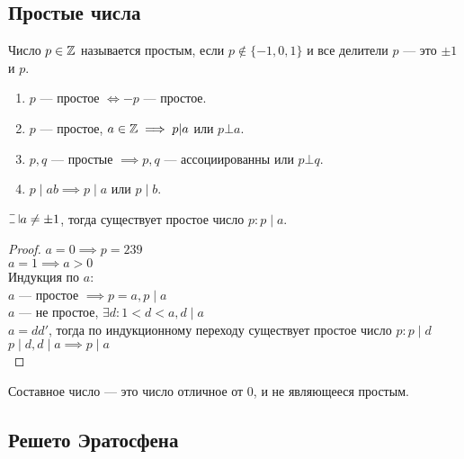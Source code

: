 \begin{normalsize}

\section{Простые числа}

\begin{defn}
    Число $p \in \mathbb{Z}$ называется простым, если $p \notin \{-1, 0, 1\}$ и все делители $p$ --- это $\pm 1$ и $p$.
\end{defn}

\begin{prop}
    \begin{enumerate}
        \item $p$ --- простое $\iff -p$ --- простое.
        \item $p$ --- простое, $a \in \mathbb{Z} \implies p | a$ или $p \bot a$.
        \item $p, q$ --- простые $\implies p, q$ --- ассоциированны или $p \bot q$.
        \item $p \mid ab \implies p \mid a$ или $p \mid b$. 
    \end{enumerate}
\end{prop}

\begin{theorem-non}
    $\letus a \neq \pm 1$, тогда существует простое число $p : p \mid a$.
\end{theorem-non}

\begin{proof}
    $a = 0 \implies p = 239$\\
    $a = 1 \implies a > 0$\\
    Индукция по $a$:\\
    $a$ --- простое $\implies p = a, p \mid a$\\
    $a$ --- не простое, $\exists d : 1 < d < a, d \mid a$\\
    $a = dd'$, тогда по индукционному переходу существует простое число $p : p \mid d$\\
    $p \mid d, d \mid a \implies p \mid a$\\
\end{proof}

\begin{defn}
    Составное число --- это число отличное от 0, и не являющееся простым.
\end{defn}

\subsection*{Решето Эратосфена}


\end{normalsize}
